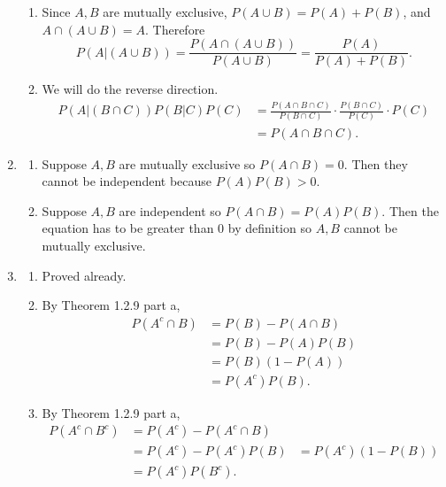 \documentclass{article}
\begin{document}
\begin{enumerate}
\begin{enumerate}
        \item Since $A, B$ are mutually exclusive, $P(A \cup B) = P(A) + P(B)$, and
        $A \cap (A \cup B) = A$. Therefore
        \[ P(A|(A \cup B)) = \frac{P(A \cap (A \cup B))}{P(A \cup B)}
        = \frac{P(A)}{P(A) + P(B)}. \]

        \item We will do the reverse direction.
        \begin{align*}
            P(A|(B \cap C))P(B|C)P(C)
            &= \frac{P(A \cap B \cap C)}{P(B \cap C)} \cdot \frac{P(B \cap C)}{P(C)}
            \cdot P(C) \\
            &= P(A \cap B \cap C).
        \end{align*}
    \end{enumerate}

    \item \begin{enumerate}
        \item Suppose $A, B$ are mutually exclusive so $P(A \cap B) = 0$. Then they cannot be
        independent because $P(A)P(B) > 0$.

        \item Suppose $A, B$ are independent so $P(A \cap B) = P(A)P(B)$. Then the equation
        has to be greater than 0 by definition so $A, B$ cannot be mutually exclusive.
    \end{enumerate}

    \item \begin{enumerate}
        \item Proved already.

        \item By Theorem 1.2.9 part a,
        \begin{align*}
            P(A^c \cap B)
            &= P(B) - P(A \cap B) \\
            &= P(B) - P(A)P(B) \\
            &= P(B)(1 - P(A)) \\
            &= P(A^{c})P(B).
        \end{align*}

        \item By Theorem 1.2.9 part a,
        \begin{align*}
            P(A^c \cap B^c)
            &= P(A^c) - P(A^c \cap B) \\
            &= P(A^{c}) - P(A^{c})P(B)
            &= P(A^{c})(1 - P(B)) \\
            &= P(A^{c})P(B^{c}).
        \end{align*}
    \end{enumerate}


\end{enumerate}
\end{document}
